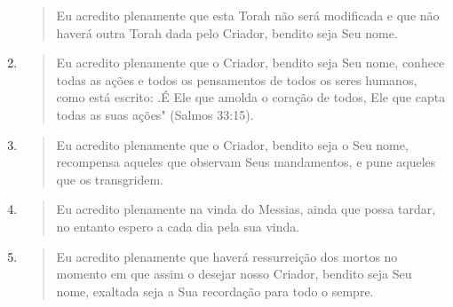 \begin{enumerate}
\begin{quote}
 Eu acredito plenamente que esta Torah não será modificada e que não
 ha­verá outra Torah dada pelo Criador, bendito seja Seu nome.
 \end{quote}
\item
 \begin{quote}
 Eu acredito plenamente que o Criador, bendito seja Seu nome, conhece
 todas as ações e todos os pensamentos de todos os seres humanos, como
 está escrito: .É Ele que amolda o coração de todos,
 Ele que capta todas as suas ações" (Salmos 33:15).
 \end{quote}
\item
 \begin{quote}
 Eu acredito plenamente que o Criador, bendito seja o Seu nome,
 recom­pensa aqueles que observam Seus mandamentos, e pune aqueles que
 os transgridem.
 \end{quote}
\item
 \begin{quote}
 Eu acredito plenamente na vinda do Messias, ainda que possa tardar, no
 entanto espero a cada dia pela sua vinda.
 \end{quote}
\item
 \begin{quote}
 Eu acredito plenamente que haverá ressurreição dos mortos no momento
 em que assim o desejar nosso Criador, bendito seja Seu nome, exaltada
 seja a Sua recordação para todo o sempre.
 \end{quote}
\end{enumerate}

